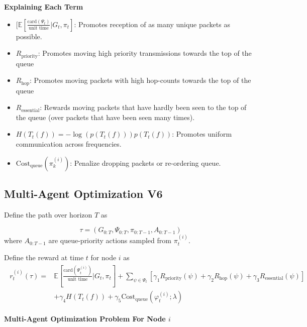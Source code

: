 \documentclass{article}
\begin{document}
\newpage
\textbf{Explaining Each Term}
\begin{itemize}
    \item $ [ \mathbb{E}[\frac{\text{card}(\Psi_{t})}{\text{unit time}} | G_{t}, \pi_{t}]$: Promotes reception of as many unique packets as possible.
    \item $R_{\text{priority}}$: Promotes moving high priority transmissions towards the top of the queue
    
    \item $R_{\text{hop}}$: Promotes moving packets with high hop-counts towards the top of the queue

    \item $R_{\text{essential}}$: Rewards moving packets that have hardly been seen to the top of the queue (over packets that have been seen many times).
    
    \item $H(T_{t}(f))= -\log(p(T_{t}(f))) p(T_{t}(f))$: Promotes uniform communication across frequencies.
    \item $\text{Cost}_{\text{queue}}(\pi_{k}^{(i)})$: Penalize dropping packets or re-ordering queue.
\end{itemize}

\newpage

\subsection{Multi-Agent Optimization V6}


Define the path over horizon $T$ as

$$
\tau = (G_{0:T}, \Psi_{0:T}, \pi_{0:T-1}, A_{0:T-1})
$$
where $A_{0:T-1}$ are queue-priority actions sampled from $\pi_{t}^{(i)}$.

Define the reward at time $t$ for node $i$ as
\begin{align*}
    \begin{split}
            r_{t}^{(i)} (\tau)  =
            &\mathbb{E}[\frac{\text{card}(\Psi_{t}^{(i)})}{\text{unit time}} | G_{t}, \pi_{t}] + \sum_{\psi \in \Psi_{t}}[ \gamma_{1} R_{\text{priority}}(\psi) + \gamma_{2} R_{\text{hop}}(\psi)  +  \gamma_{3} R_{\text{essential}}(\psi)]
            \\ &+ \gamma_{4} H(T_{t}(f)) + \gamma_{5} \text{Cost}_{\text{queue}}(\varphi_{t}^{(i)}; \lambda)
    \end{split}
\end{align*}\nonumber


\noindent \textbf{Multi-Agent Optimization Problem For Node $i$}
\\
\noindent{}
\end{document}
